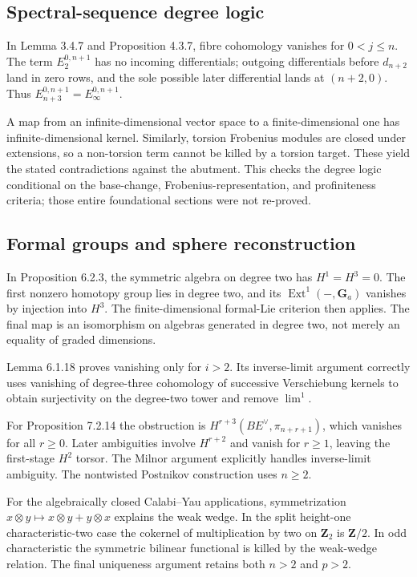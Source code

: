 \documentclass[10pt]{article}
\begin{document}
\subsection*{Spectral-sequence degree logic}
In Lemma 3.4.7 and Proposition 4.3.7, fibre cohomology vanishes for \(0<j\le n\). The term \(E_2^{0,n+1}\) has no incoming differentials; outgoing differentials before \(d_{n+2}\) land in zero rows, and the sole possible later differential lands at \((n+2,0)\). Thus \(E_{n+3}^{0,n+1}=E_\infty^{0,n+1}\).\par
A map from an infinite-dimensional vector space to a finite-dimensional one has infinite-dimensional kernel. Similarly, torsion Frobenius modules are closed under extensions, so a non-torsion term cannot be killed by a torsion target. These yield the stated contradictions against the abutment. This checks the degree logic conditional on the base-change, Frobenius-representation, and profiniteness criteria; those entire foundational sections were not re-proved.\par
\subsection*{Formal groups and sphere reconstruction}
In Proposition 6.2.3, the symmetric algebra on degree two has \(H^1=H^3=0\). The first nonzero homotopy group lies in degree two, and its \(\operatorname{Ext}^1(-,\mathbf G_a)\) vanishes by injection into \(H^3\). The finite-dimensional formal-Lie criterion then applies. The final map is an isomorphism on algebras generated in degree two, not merely an equality of graded dimensions.\par
Lemma 6.1.18 proves vanishing only for \(i>2\). Its inverse-limit argument correctly uses vanishing of degree-three cohomology of successive Verschiebung kernels to obtain surjectivity on the degree-two tower and remove \(\lim^1\).\par
For Proposition 7.2.14 the obstruction is \(H^{r+3}(BE^\vee,\pi_{n+r+1})\), which vanishes for all \(r\ge0\). Later ambiguities involve \(H^{r+2}\) and vanish for \(r\ge1\), leaving the first-stage \(H^2\) torsor. The Milnor argument explicitly handles inverse-limit ambiguity. The nontwisted Postnikov construction uses \(n\ge2\).\par
For the algebraically closed Calabi–Yau applications, symmetrization \(x\otimes y\mapsto x\otimes y+y\otimes x\) explains the weak wedge. In the split height-one characteristic-two case the cokernel of multiplication by two on \(\mathbf Z_2\) is \(\mathbf Z/2\). In odd characteristic the symmetric bilinear functional is killed by the weak-wedge relation. The final uniqueness argument retains both \(n>2\) and \(p>2\).\par
\end{document}
